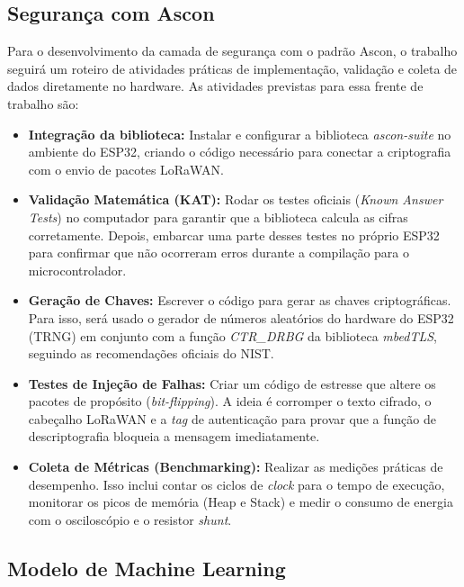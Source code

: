 
\subsection{Segurança com Ascon}
Para o desenvolvimento da camada de segurança com o padrão Ascon, o trabalho seguirá um roteiro de atividades práticas de implementação, validação e coleta de dados diretamente no hardware. As atividades previstas para essa frente de trabalho são:
\begin{itemize}
    \item \textbf{Integração da biblioteca:} Instalar e configurar a biblioteca \textit{ascon-suite} no ambiente do ESP32, criando o código necessário para conectar a criptografia com o envio de pacotes LoRaWAN.
    
    \item \textbf{Validação Matemática (KAT):} Rodar os testes oficiais (\textit{Known Answer Tests}) no computador para garantir que a biblioteca calcula as cifras corretamente. Depois, embarcar uma parte desses testes no próprio ESP32 para confirmar que não ocorreram erros durante a compilação para o microcontrolador.
    
    \item \textbf{Geração de Chaves:} Escrever o código para gerar as chaves criptográficas. Para isso, será usado o gerador de números aleatórios do hardware do ESP32 (TRNG) em conjunto com a função \textit{CTR\_DRBG} da biblioteca \textit{mbedTLS}, seguindo as recomendações oficiais do NIST.
    
    \item \textbf{Testes de Injeção de Falhas:} Criar um código de estresse que altere os pacotes de propósito (\textit{bit-flipping}). A ideia é corromper o texto cifrado, o cabeçalho LoRaWAN e a \textit{tag} de autenticação para provar que a função de descriptografia bloqueia a mensagem imediatamente.
    
    \item \textbf{Coleta de Métricas (Benchmarking):} Realizar as medições práticas de desempenho. Isso inclui contar os ciclos de \textit{clock} para o tempo de execução, monitorar os picos de memória (Heap e Stack) e medir o consumo de energia com o osciloscópio e o resistor \textit{shunt}.
\end{itemize}


\subsection{Modelo de Machine Learning}

